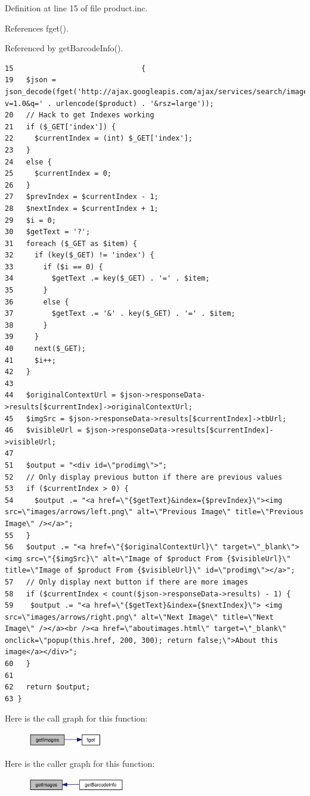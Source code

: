 Definition at line 15 of file product.inc.

References fget().

Referenced by getBarcodeInfo().

\begin{Code}\begin{verbatim}15                              {
19   $json = json_decode(fget('http://ajax.googleapis.com/ajax/services/search/images?v=1.0&q=' . urlencode($product) . '&rsz=large'));
20   // Hack to get Indexes working
21   if ($_GET['index']) {
22     $currentIndex = (int) $_GET['index'];
23   }
24   else {
25     $currentIndex = 0;
26   }
27   $prevIndex = $currentIndex - 1;
28   $nextIndex = $currentIndex + 1;
29   $i = 0;
30   $getText = '?';
31   foreach ($_GET as $item) {
32     if (key($_GET) != 'index') {
33       if ($i == 0) {
34         $getText .= key($_GET) . '=' . $item;
35       }
36       else {
37         $getText .= '&' . key($_GET) . '=' . $item;
38       }
39     }
40     next($_GET);
41     $i++;
42   }
43 
44   $originalContextUrl = $json->responseData->results[$currentIndex]->originalContextUrl;
45   $imgSrc = $json->responseData->results[$currentIndex]->tbUrl;
46   $visibleUrl = $json->responseData->results[$currentIndex]->visibleUrl;
47 
51   $output = "<div id=\"prodimg\">";
52   // Only display previous button if there are previous values
53   if ($currentIndex > 0) {
54     $output .= "<a href=\"{$getText}&index={$prevIndex}\"><img src=\"images/arrows/left.png\" alt=\"Previous Image\" title=\"Previous Image\" /></a>";
55   }
56   $output .= "<a href=\"{$originalContextUrl}\" target=\"_blank\"><img src=\"{$imgSrc}\" alt=\"Image of $product From {$visibleUrl}\" title=\"Image of $product From {$visibleUrl}\" id=\"prodimg\"></a>";
57   // Only display next button if there are more images
58   if ($currentIndex < count($json->responseData->results) - 1) {
59    $output .= "<a href=\"{$getText}&index={$nextIndex}\"> <img src=\"images/arrows/right.png\" alt=\"Next Image\" title=\"Next Image\" /></a><br /><a href=\"aboutimages.html\" target=\"_blank\" onclick=\"popup(this.href, 200, 300); return false;\">About this image</a></div>";
60   }
61 
62   return $output;
63 }
\end{verbatim}
\end{Code}




Here is the call graph for this function:\nopagebreak
\begin{figure}[H]
\begin{center}
\leavevmode
\includegraphics[width=92pt]{product_8inc_9dbb778854cfe105058d7161ca8f058c_cgraph}
\end{center}
\end{figure}


Here is the caller graph for this function:\nopagebreak
\begin{figure}[H]
\begin{center}
\leavevmode
\includegraphics[width=120pt]{product_8inc_9dbb778854cfe105058d7161ca8f058c_icgraph}
\end{center}
\end{figure}
